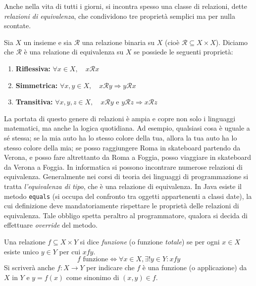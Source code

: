 Anche nella vita di tutti i giorni, si incontra spesso una classe di relazioni,
dette \textit{relazioni di equivalenza}, che condividono tre proprietà semplici ma per
nulla scontate.

\begin{tcolorbox}[colback=yellow!30, colframe=yellow!30!black, title={Relazione di equivalenza}]
Sia $X$ un insieme e sia $\mathcal{R}$ una relazione binaria su $X$
(cioè $\mathcal{R} \subseteq X \times X$). Diciamo che $\mathcal{R}$ è una
relazione di equivalenza su $X$ se possiede le seguenti proprietà:
\begin{enumerate}
    \item \textbf{Riflessiva:} $\forall x \in X, \quad x \mathcal{R} x$
    \item \textbf{Simmetrica:} $\forall x,y \in X, \quad x \mathcal{R}y \Longrightarrow y \mathcal{R} x$
    \item \textbf{Transitiva:} $\forall x,y,z \in X, \quad x \mathcal{R} y \text{ e } y \mathcal{R} z \Longrightarrow x \mathcal{R} z$
\end{enumerate}
\end{tcolorbox}
La portata di questo genere di relazioni è ampia e copre non solo i linguaggi
matematici, ma anche la logica quotidiana. Ad esempio, qualsiasi cosa è uguale
a sé stessa; se la mia auto ha lo stesso colore della tua, allora la tua auto ha lo stesso
colore della mia; se posso raggiungere Roma in skateboard partendo da Verona,
e posso fare altrettanto da Roma a Foggia, posso viaggiare in skateboard da
Verona a Foggia. In informatica si possono incontrare numerose relazioni di
equivalenza. Generalmente nei corsi di teoria dei linguaggi di programmazione
si tratta \textit{l'equivalenza di tipo}, che è una relazione di equivalenza.
In Java esiste il metodo \texttt{equals} (si occupa del confronto tra oggetti
appartenenti a classi date), la cui definizione deve mandatoriamente
rispettare le proprietà delle relazioni di equivalenza. Tale obbligo spetta
peraltro al programmatore, qualora si decida di effettuare \textit{override}
del metodo.

\begin{tcolorbox}[colback=yellow!30, colframe=yellow!30!black, title={Funzione}]
Una relazione $f\subseteq X\times Y$ si dice \textit{funzione} (o funzione
\textit{totale}) se per ogni $x\in X$ esiste unico $y\in Y$ per cui $xfy$.
\[ f \text{ funzione} \Longleftrightarrow \forall x\in X,\exists!y\in Y:xfy \]
Si scriverà anche $f:X\to Y$ per indicare che $f$ è una funzione (o applicazione)
da $X$ in $Y$ e $y=f(x)$ come sinonimo di $(x,y)\in f$.
\end{tcolorbox}

